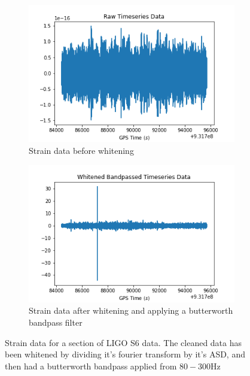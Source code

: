 \documentclass{article}
\begin{document}
\begin{figure}
\begin{subfigure}[t]{0.5\textwidth}
\includegraphics[width=\textwidth]{dirty.png}
\caption{Strain data before whitening}
\label{fig:dirty}
\end{subfigure}
\begin{subfigure}[t]{0.5\textwidth}
\includegraphics[width=\textwidth]{clean.png}
\caption{Strain data after whitening and applying a butterworth bandpass filter}
\label{fig:clean}
\end{subfigure}
\caption{Strain data for a section of LIGO S6 data. The cleaned data has been whitened by dividing it's fourier transform by it's ASD, and then had a butterworth bandpass applied from $80-300\mathrm{Hz}$}
\label{fig:cleaning}
\end{figure}
\end{document}
